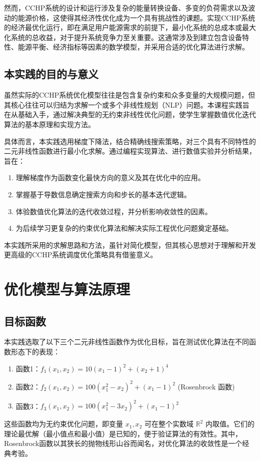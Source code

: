 \documentclass[12pt]{article} %
\begin{document}
然而，CCHP系统的设计和运行涉及复杂的能量转换设备、多变的负荷需求以及波动的能源价格，这使得其经济性优化成为一个具有挑战性的课题。实现CCHP系统的经济最优化运行，即在满足用户能源需求的前提下，最小化系统的总成本或最大化系统的总收益，对于提升系统竞争力至关重要。这通常涉及到建立包含设备特性、能源平衡、经济指标等因素的数学模型，并采用合适的优化算法进行求解。

\subsection{本实践的目的与意义}
虽然实际的CCHP系统优化模型往往是包含复杂约束和众多变量的大规模问题，但其核心往往可以归结为求解一个或多个非线性规划（NLP）问题。本课程实践旨在从基础入手，通过解决典型的无约束非线性优化问题，使学生掌握数值优化迭代算法的基本原理和实现方法。

具体而言，本实践选用梯度下降法，结合精确线搜索策略，对三个具有不同特性的二元非线性函数进行最小化求解。通过编程实现算法、进行数值实验并分析结果，旨在：
\begin{enumerate}
    \item 理解梯度作为函数变化最快方向的意义及其在优化中的应用。
    \item 掌握基于导数信息确定搜索方向和步长的基本迭代逻辑。
    \item 体验数值优化算法的迭代收敛过程，并分析影响收敛性的因素。
    \item 为后续学习更复杂的约束优化算法和解决实际工程优化问题奠定基础。
\end{enumerate}
本实践所采用的求解思路和方法，虽针对简化模型，但其核心思想对于理解和开发更高级的CCHP系统调度优化策略具有借鉴意义。

\section{优化模型与算法原理}
\subsection{目标函数}
本实践选取了以下三个二元非线性函数作为优化目标，旨在测试优化算法在不同函数形态下的表现：
\begin{enumerate}
    \item 函数1：\(f_1(x_1, x_2) = 10(x_1-1)^2 + (x_2+1)^4\)
    \item 函数2：\(f_2(x_1, x_2) = 100(x_1^2-x_2)^2 + (x_1-1)^2\) (Rosenbrock 函数)
    \item 函数3：\(f_3(x_1, x_2) = 100(x_1^2-3x_2)^2 + (x_1-1)^2\)
\end{enumerate}
这些函数均为无约束优化问题，即变量 \(x_1, x_2\) 可在整个实数域 \(\mathbb{R}^2\) 内取值。它们的理论最优解（最小值点和最小值）是已知的，便于验证算法的有效性。其中，Rosenbrock函数以其狭长的抛物线形山谷而闻名，对优化算法的收敛性是一个经典考验。
\end{document}
